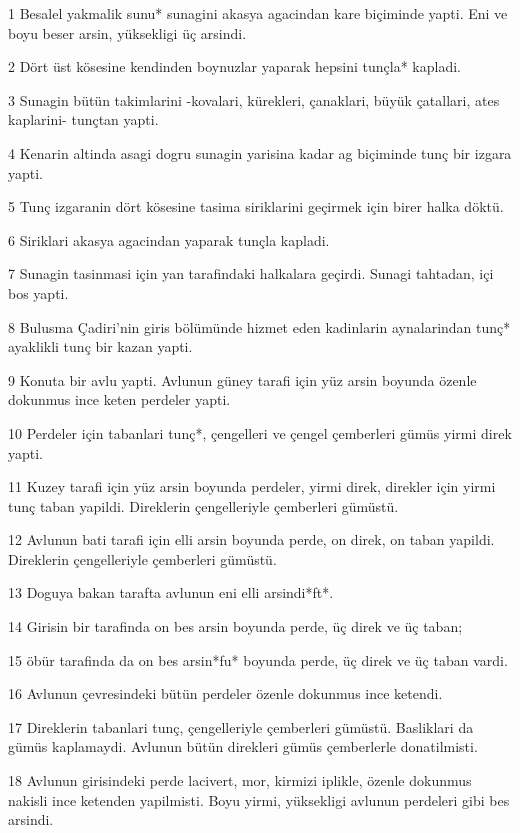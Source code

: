 \par 1 Besalel yakmalik sunu* sunagini akasya agacindan kare biçiminde yapti. Eni ve boyu beser arsin, yüksekligi üç arsindi.
\par 2 Dört üst kösesine kendinden boynuzlar yaparak hepsini tunçla* kapladi.
\par 3 Sunagin bütün takimlarini -kovalari, kürekleri, çanaklari, büyük çatallari, ates kaplarini- tunçtan yapti.
\par 4 Kenarin altinda asagi dogru sunagin yarisina kadar ag biçiminde tunç bir izgara yapti.
\par 5 Tunç izgaranin dört kösesine tasima siriklarini geçirmek için birer halka döktü.
\par 6 Siriklari akasya agacindan yaparak tunçla kapladi.
\par 7 Sunagin tasinmasi için yan tarafindaki halkalara geçirdi. Sunagi tahtadan, içi bos yapti.
\par 8 Bulusma Çadiri'nin giris bölümünde hizmet eden kadinlarin aynalarindan tunç* ayaklikli tunç bir kazan yapti.
\par 9 Konuta bir avlu yapti. Avlunun güney tarafi için yüz arsin boyunda özenle dokunmus ince keten perdeler yapti.
\par 10 Perdeler için tabanlari tunç*, çengelleri ve çengel çemberleri gümüs yirmi direk yapti.
\par 11 Kuzey tarafi için yüz arsin boyunda perdeler, yirmi direk, direkler için yirmi tunç taban yapildi. Direklerin çengelleriyle çemberleri gümüstü.
\par 12 Avlunun bati tarafi için elli arsin boyunda perde, on direk, on taban yapildi. Direklerin çengelleriyle çemberleri gümüstü.
\par 13 Doguya bakan tarafta avlunun eni elli arsindi*ft*.
\par 14 Girisin bir tarafinda on bes arsin boyunda perde, üç direk ve üç taban;
\par 15 öbür tarafinda da on bes arsin*fu* boyunda perde, üç direk ve üç taban vardi.
\par 16 Avlunun çevresindeki bütün perdeler özenle dokunmus ince ketendi.
\par 17 Direklerin tabanlari tunç, çengelleriyle çemberleri gümüstü. Basliklari da gümüs kaplamaydi. Avlunun bütün direkleri gümüs çemberlerle donatilmisti.
\par 18 Avlunun girisindeki perde lacivert, mor, kirmizi iplikle, özenle dokunmus nakisli ince ketenden yapilmisti. Boyu yirmi, yüksekligi avlunun perdeleri gibi bes arsindi.
